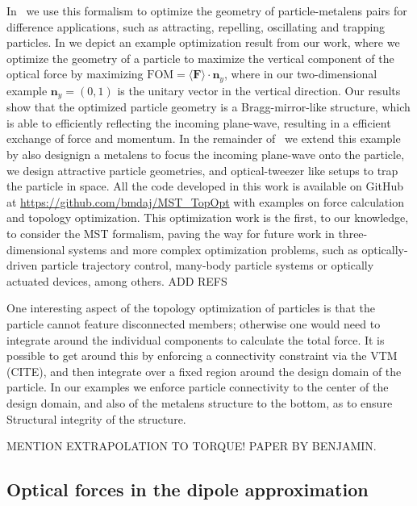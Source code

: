 In~\cite{ownpub3} we use this formalism to optimize the geometry of particle-metalens pairs for difference applications, such as attracting, repelling, 
oscillating and trapping particles. In  we depict an example optimization result from our work, where 
we optimize the geometry of a particle to maximize the vertical component of the optical force by maximizing $\text{FOM} = \langle\mathbf{F}\rangle \cdot \mathbf{n}_y$, where
in our two-dimensional example $\mathbf{n}_y = (0, 1)$ is the unitary vector in the vertical direction. Our results show that the optimized particle geometry is a Bragg-mirror-like
structure, which is able to efficiently reflecting the incoming plane-wave, resulting in a efficient exchange of force and momentum. In the remainder of~\cite{ownpub3} we extend this example by also designign a metalens to focus the incoming plane-wave onto the particle,
we design attractive particle geometries, and optical-tweezer like setups to trap the particle in space. All the code developed in this work is available on GitHub
at \url{https://github.com/bmdaj/MST_TopOpt} with examples on force calculation and topology optimization. This optimization work is the first, to our knowledge, to 
consider the MST formalism, paving the way for future work in three-dimensional systems and more complex optimization problems, such as optically-driven particle
trajectory control, many-body particle systems or optically actuated devices, among others. ADD REFS

One interesting aspect of the topology optimization of particles is that the particle cannot feature disconnected members; otherwise
one would need to integrate around the individual components to calculate the total force. It is possible to get around this by enforcing 
a connectivity constraint via the VTM (CITE), and then integrate over a fixed region around the design domain of the particle. In our examples
we enforce particle connectivity to the center of the design domain, and also of the metalens structure to the bottom, as to ensure Structural
integrity of the structure.

MENTION EXTRAPOLATION TO TORQUE! PAPER BY BENJAMIN.

\subsection*{Optical forces in the dipole approximation~\cite{ownpub1}}


